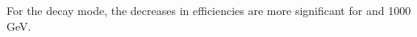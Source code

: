 For the \decayThreePionPhotonShort decay mode, the decreases in efficiencies are more significant for  and 1000\,GeV.













